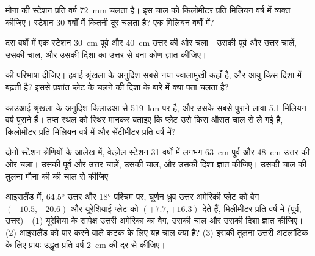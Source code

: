 \begin{exercise}[$\star$]\label{exo:g11:plate-motions:2}
मौना की स्टेशन प्रति वर्ष \qty{72}{mm} चलता है। इस चाल को
किलोमीटर प्रति मिलियन वर्ष में व्यक्त कीजिए। स्टेशन 30 वर्षों में कितनी दूर चलता है?
एक मिलियन वर्षों में?
\end{exercise}

\begin{exercise}[$\star$]\label{exo:g11:plate-motions:3}
दस वर्षों में एक स्टेशन \qty{30}{cm} पूर्व और \qty{40}{cm} उत्तर की ओर चला।
उसकी पूर्व और उत्तर चालें, उसकी चाल, और उसकी दिशा का उत्तर से बना
कोण ज्ञात कीजिए।
\end{exercise}

\begin{exercise}[$\star$]\label{exo:g11:plate-motions:4}
 की परिभाषा दीजिए। हवाई श्रृंखला के अनुदिश सबसे नया
ज्वालामुखी कहाँ है, और आयु किस दिशा में बढ़ती है? इससे
प्रशांत प्लेट के चलने की दिशा के बारे में क्या पता चलता है?
\end{exercise}

\begin{exercise}[$\star$]\label{exo:g11:plate-motions:5}
काउआई श्रृंखला के अनुदिश किलाउआ से \qty{519}{km} पर है, और उसके सबसे पुराने लावा
\num{5.1} मिलियन वर्ष पुराने हैं। तप्त स्थल को स्थिर मानकर बताइए कि प्लेट उसे
किस औसत चाल से ले गई है, किलोमीटर प्रति मिलियन वर्ष में और
सेंटीमीटर प्रति वर्ष में?
\end{exercise}

\begin{exercise}[$\star\star$]\label{exo:g11:plate-motions:6}
दोनों स्टेशन-श्रेणियों के आलेख में, वेत्ज़ेल स्टेशन 31 वर्षों में लगभग
\qty{63}{cm} पूर्व और \qty{48}{cm} उत्तर की ओर चला। उसकी पूर्व और उत्तर
चालें, उसकी चाल, और उसकी दिशा ज्ञात कीजिए। उसकी चाल की तुलना मौना
की की चाल से कीजिए।
\end{exercise}

\begin{exercise}[$\star\star$]\label{exo:g11:plate-motions:7}
आइसलैंड में, \ang{64.5} उत्तर और \ang{18} पश्चिम पर, घूर्णन ध्रुव
उत्तर अमेरिकी प्लेट को वेग $(-10.5, +20.6)$ और यूरेशियाई
प्लेट को $(+7.7, +16.3)$ देते हैं, मिलीमीटर प्रति वर्ष में (पूर्व, उत्तर)। (1)
यूरेशिया के सापेक्ष उत्तरी अमेरिका का वेग, उसकी चाल और उसकी दिशा ज्ञात कीजिए।
(2) आइसलैंड को पार करने वाले कटक के लिए यह चाल क्या है? (3) इसकी तुलना
उत्तरी अटलांटिक के लिए प्रायः उद्धृत प्रति वर्ष \qty{2}{cm} की दर से कीजिए।
\end{exercise}

